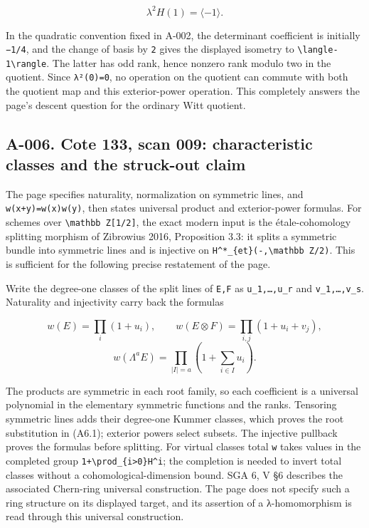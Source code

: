 \documentclass[
  10pt,
]{article}
\begin{document}
\[
\lambda^2 H(1)=\langle-1\rangle.
\]

In the quadratic convention fixed in A-002, the determinant coefficient
is initially \texttt{\small −1/\allowbreak{}4}, and the change of basis
by \texttt{\small 2} gives the displayed isometry to
\texttt{\small \textbackslash{}langle-\allowbreak{}1\textbackslash{}rangle}.
The latter has odd rank, hence nonzero rank modulo two in the quotient.
Since \texttt{\small λ²(\allowbreak{}0)\allowbreak{}=\allowbreak{}0}, no
operation on the quotient can commute with both the quotient map and
this exterior-power operation. This completely answers the page's
descent question for the ordinary Witt quotient.

\subsection{A-006. Cote 133, scan 009: characteristic classes and the
struck-out
claim}\label{a-006.-cote-133-scan-009-characteristic-classes-and-the-struck-out-claim}

The page specifies naturality, normalization on symmetric lines, and
\texttt{\small w(\allowbreak{}x+\allowbreak{}y)\allowbreak{}=\allowbreak{}w(\allowbreak{}x)\allowbreak{}w(\allowbreak{}y)\allowbreak{}},
then states universal product and exterior-power formulas. For schemes
over
\texttt{\small \textbackslash{}mathbb Z[\allowbreak{}1/\allowbreak{}2]\allowbreak{}},
the exact modern input is the étale-cohomology splitting morphism of
Zibrowius 2016, Proposition 3.3: it splits a symmetric bundle into
symmetric lines and is injective on
\texttt{\small H\textasciicircum{}*\_\allowbreak{}\{et\}(\allowbreak{}-\allowbreak{},\allowbreak{}\textbackslash{}mathbb Z/\allowbreak{}2)\allowbreak{}}.
This is sufficient for the following precise restatement of the page.

Write the degree-one classes of the split lines of
\texttt{\small E,\allowbreak{}F} as
\texttt{\small u\_\allowbreak{}1,\allowbreak{}…,\allowbreak{}u\_\allowbreak{}r}
and
\texttt{\small v\_\allowbreak{}1,\allowbreak{}…,\allowbreak{}v\_\allowbreak{}s}.
Naturality and injectivity carry back the formulas

\[
w(E)=\prod_i(1+u_i),\qquad
w(E\otimes F)=\prod_{i,j}(1+u_i+v_j),
\] \[
w(\Lambda^a E)=\prod_{|I|=a}\left(1+\sum_{i\in I}u_i\right).
\tag{A6.1}
\]

The products are symmetric in each root family, so each coefficient is a
universal polynomial in the elementary symmetric functions and the
ranks. Tensoring symmetric lines adds their degree-one Kummer classes,
which proves the root substitution in (A6.1); exterior powers select
subsets. The injective pullback proves the formulas before splitting.
For virtual classes total \texttt{\small w} takes values in the
completed group
\texttt{\small 1+\allowbreak{}\textbackslash{}prod\_\allowbreak{}\{i>0\}H\textasciicircum{}i};
the completion is needed to invert total classes without a
cohomological-dimension bound. SGA 6, V §6 describes the associated
Chern-ring universal construction. The page does not specify such a ring
structure on its displayed target, and its assertion of a λ-homomorphism
is read through this universal construction.
\end{document}
